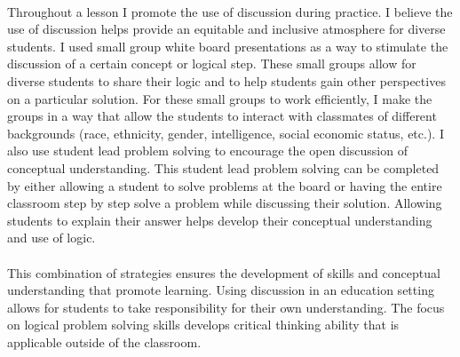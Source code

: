 \documentclass[12pt,letterpaper]{article}
\begin{document}
\paragraph{}Throughout a lesson I promote the use of discussion during practice. I believe the use of discussion helps provide an equitable and inclusive atmosphere for diverse students. I used small group white board presentations as a way to stimulate the discussion of a certain concept or logical step. These small groups allow for diverse students to share their logic and to help students gain other perspectives on a particular solution. For these small groups to work efficiently, I make the groups in a way that allow the students to interact with classmates of different backgrounds (race, ethnicity, gender, intelligence, social economic status, etc.).  I also use student lead problem solving to encourage the open discussion of conceptual understanding. This student lead problem solving can be completed by either allowing a student to solve problems at the board or having the entire classroom step by step solve a problem while discussing their solution. Allowing students to explain their answer helps develop their conceptual understanding and use of logic. 
	
\paragraph{} This combination of strategies ensures the development of skills and conceptual understanding that promote learning. Using discussion in an education setting allows for students to take responsibility for their own understanding. The focus on logical problem solving skills develops critical thinking ability that is applicable outside of the classroom. 
\end{document}
